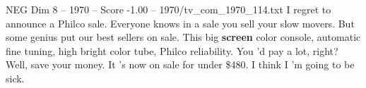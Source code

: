 \begin{textsample}{NEG Dim 8 – 1970 – Score -1.00 – 1970/tv\_com\_1970\_114.txt}  \label{ex:f8_neg_002}
I regret to announce a Philco sale.
Everyone knows in a sale you sell your slow movers.
But some genius put our best sellers on sale.
This big \textbf{screen} color console, automatic fine tuning, high bright color tube, Philco reliability.
You 'd pay a lot, right?
Well, save your money.
It 's now on sale for under \$480.
I think I 'm going to be sick.

\end{textsample}
